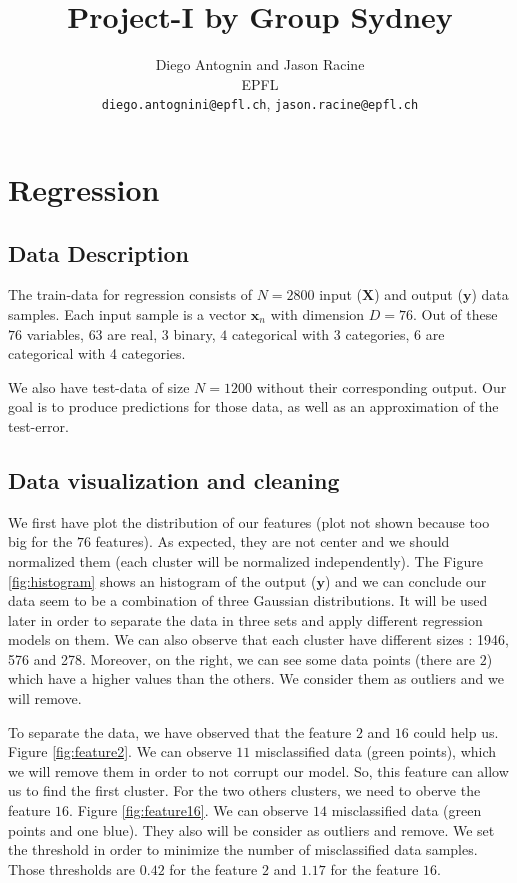 \documentclass{article} %
\title{Project-I by Group Sydney}
\author{
Diego Antognin and Jason Racine \\
EPFL \\
\texttt{diego.antognini@epfl.ch}, \texttt{jason.racine@epfl.ch} \\
}
\begin{document}
\maketitle

\begin{abstract}

\end{abstract}

\section{Regression}

\subsection{Data Description}

The train-data for regression consists of $N = 2800$ input ($\mathbf{X}$) and output ($\mathbf{y}$) data samples. Each input sample is a vector $\mathbf{x}_n$ with dimension $D = 76$. Out of these $76$ variables, $63$ are real, $3$ binary, $4$ categorical with 3 categories, $6$ are categorical with 4 categories.

We also have test-data of size $N=1200$ without their corresponding output. Our goal is to produce predictions for those data, as well as an approximation of the test-error.

\subsection{Data visualization and cleaning}

We first have plot the distribution of our features (plot not shown because too big for the $76$ features). As expected, they are not center and we should normalized them (each cluster will be normalized independently). The Figure \ref{fig:histogram} shows an histogram of the output ($\mathbf{y}$) and we can conclude our data  seem to be a combination of three Gaussian distributions. It will be used later in order to separate the data in three sets and apply different regression models on them. We can also observe that each cluster have different sizes : 1946, 576 and 278. Moreover, on the right, we can see some data points (there are $2$) which have a higher values than the others. We consider them as outliers and we will remove.

To separate the data, we have observed that the feature $2$ and $16$ could help us. Figure \ref{fig:feature2}. We can observe $11$ misclassified data (green points), which we will remove them in order to not corrupt our model.  So, this feature can allow us to find the first cluster. For the two others clusters, we need to oberve the feature $16$. Figure \ref{fig:feature16}. We can observe $14$ misclassified data (green points and one blue). They also will be consider as outliers and remove. We set the threshold in order to minimize the number of misclassified data samples. Those thresholds are $0.42$ for the feature $2$ and $1.17$ for the feature $16$.
\end{document}
